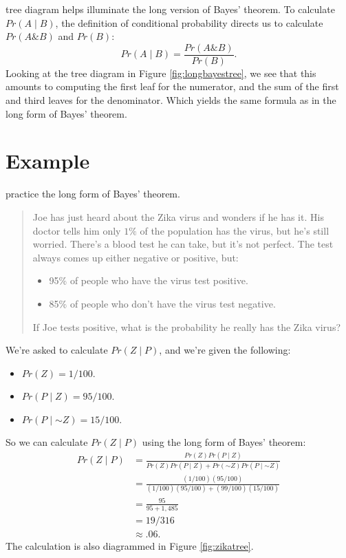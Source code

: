 \documentclass[justified]{tufte-book}
\providecommand{\tightlist}{%
  \setlength{\itemsep}{0pt}\setlength{\parskip}{0pt}}
\newcommand{\given}{\mid}
\renewcommand{\neg}{\mathbin{\sim}}
\renewcommand{\wedge}{\mathbin{\&}}
\newcommand{\p}{Pr}
\newenvironment{problem}{\begin{quote}\normalsize}{\end{quote}}
\theoremstyle{definition}
\theoremstyle{definition}
\theoremstyle{definition}
\theoremstyle{remark}
\begin{document}
 tree diagram helps illuminate the long version of Bayes' theorem. To calculate \(\p(A \given B)\), the definition of conditional probability directs us to calculate \(\p(A \wedge B)\) and \(\p(B)\):
\[ \p(A \given B) = \frac{ \p(A \wedge B) }{ \p(B) }. \]
Looking at the tree diagram in Figure \ref{fig:longbayestree}, we see that this amounts to computing the first leaf for the numerator, and the sum of the first and third leaves for the denominator. Which yields the same formula as in the long form of Bayes' theorem.

\hypertarget{example-1}{%
\section{Example}\label{example-1}}

 practice the long form of Bayes' theorem.

\begin{problem}
Joe has just heard about the Zika virus and wonders if he has it. His
doctor tells him only \(1\%\) of the population has the virus, but he's
still worried. There's a blood test he can take, but it's not perfect.
The test always comes up either negative or positive, but:

\begin{itemize}
\tightlist
\item
  95\% of people who have the virus test positive.
\item
  85\% of people who don't have the virus test negative.
\end{itemize}

If Joe tests positive, what is the probability he really has the Zika
virus?
\end{problem}

We're asked to calculate \(\p(Z \given P)\), and we're given the following:

\begin{itemize}
\tightlist
\item
  \(\p(Z) = 1/100\).
\item
  \(\p(P \given Z) = 95/100\).
\item
  \(\p(P \given \neg Z) = 15/100\).
\end{itemize}

So we can calculate \(\p(Z \given P)\) using the long form of Bayes' theorem:
\[
  \begin{aligned}
    \p(Z \given P) &= \frac{\p(Z)\p(P \given Z)}{\p(Z)\p(P \given Z) + \p(\neg Z)\p(P \given \neg Z)}\\
                   &= \frac{(1/100)(95/100)}{(1/100)(95/100) + (99/100)(15/100)}\\
                   &= \frac{95}{95 + 1,485}\\
                   &= 19/316\\
                   &\approx .06.
  \end{aligned}
\]
The calculation is also diagrammed in Figure \ref{fig:zikatree}.
\end{document}
